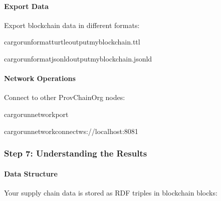\documentclass[letterpaper,10pt,english]{sphinxmanual}
\begin{document}
\paragraph{Export Data}
\label{\detokenize{tutorials/first-supply-chain:export-data}}
\sphinxAtStartPar
Export blockchain data in different formats:

\begin{sphinxVerbatim}[commandchars=\\\{\}]
cargorun\PYGZhy{}\PYGZhy{}\PYGZhy{}\PYGZhy{}formatturtle\PYGZhy{}\PYGZhy{}outputmy\PYGZus{}blockchain.ttl

cargorun\PYGZhy{}\PYGZhy{}\PYGZhy{}\PYGZhy{}formatjsonld\PYGZhy{}\PYGZhy{}outputmy\PYGZus{}blockchain.jsonld
\end{sphinxVerbatim}


\paragraph{Network Operations}
\label{\detokenize{tutorials/first-supply-chain:network-operations}}
\sphinxAtStartPar
Connect to other ProvChainOrg nodes:

\begin{sphinxVerbatim}[commandchars=\\\{\}]
cargorun\PYGZhy{}\PYGZhy{}network\PYGZhy{}\PYGZhy{}port

cargorun\PYGZhy{}\PYGZhy{}network\PYGZhy{}\PYGZhy{}connectws://localhost:8081
\end{sphinxVerbatim}


\subsubsection{Step 7: Understanding the Results}
\label{\detokenize{tutorials/first-supply-chain:step-7-understanding-the-results}}

\paragraph{Data Structure}
\label{\detokenize{tutorials/first-supply-chain:data-structure}}
\sphinxAtStartPar
Your supply chain data is stored as RDF triples in blockchain blocks:
\end{document}
